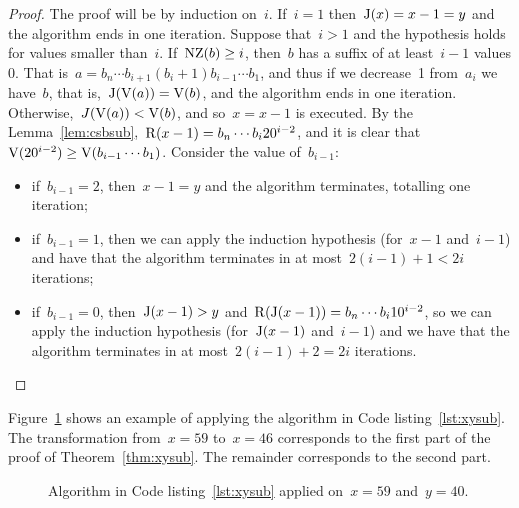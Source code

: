 \documentclass[main.tex]{subfiles}
\begin{document}
\begin{proof}
	The proof will be by induction on~$i$. If~$i = 1$ then~${\operatorname{J}(x) = x - 1 = y}$ and the algorithm ends in one iteration.
	Suppose that~$i > 1$ and the hypothesis holds for values smaller than~$i$. If~${\operatorname{NZ}(b) \geq i}$, then~$b$ has a suffix of at least~$i - 1$ values 0. That is~${a = b_n \cdots b_{i + 1} (b_{i} + 1) b_{i - 1} \cdots b_1}$, and thus if we decrease~1 from~$a_{i}$ we have~$b$, that is,~${\operatorname{J}(\operatorname{V}(a)) = \operatorname{V}(b)}$, and the algorithm ends in one iteration.
	Otherwise,~${J(\operatorname{V}(a)) < \operatorname{V}(b)}$, and so~$x = x - 1$ is executed. By the Lemma~\ref{lem:csbsub},~${\operatorname{R}(x - 1) = b_n \cdots b_i 2 0^{i-2}}$, and it is clear that~${\operatorname{V}(20^{i-2}) \geq \operatorname{V}(b_{i-1} \cdots b_1)}$. Consider the value of~$b_{i-1}$:
	\begin{itemize}
		\item if~$b_{i-1} = 2$, then~$x - 1 = y$ and the algorithm terminates, totalling one iteration;
		\item if~$b_{i-1} = 1$, then we can apply the induction hypothesis (for~$x - 1$ and~$i - 1$) and have that the algorithm terminates in at most~$2(i - 1) + 1 < 2i$ iterations;
		\item if~$b_{i-1} = 0$, then~$\operatorname{J}(x - 1) > y$ and~$\operatorname{R}(\operatorname{J}(x - 1)) = b_n \cdots b_i 1 0^{i-2}$, so we can apply the induction hypothesis (for~$\operatorname{J}(x-1)$ and~$i-1$) and we have that the algorithm terminates in at most~$2(i-1) + 2 = 2i$ iterations.
	\end{itemize}
\end{proof}

Figure~\ref{fig:exxysub} shows an example of applying the algorithm in Code listing~\ref{lst:xysub}. The transformation from~$x = 59$ to~$x = 46$ corresponds to the first part of the proof of Theorem~\ref{thm:xysub}. The remainder corresponds to the second part.

\begin{figure}[H]
\caption{Algorithm in Code listing~\ref{lst:xysub} applied on~$x = 59$ and~$y = 40$.} \label{fig:exxysub}
\end{figure}
\end{document}
